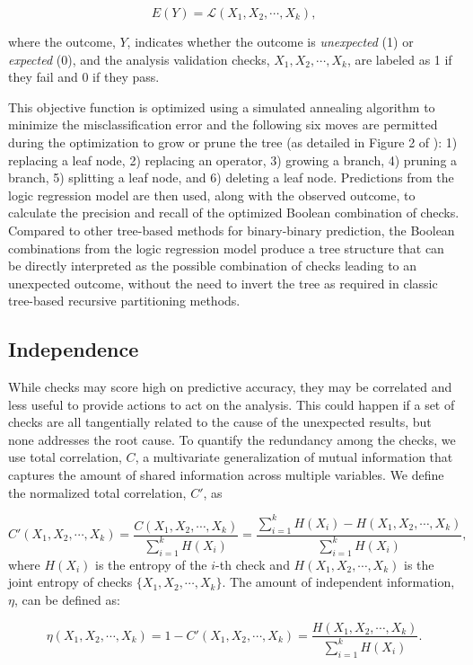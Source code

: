 \documentclass[
  12pt,
]{interact}
\begin{document}
\[E(Y) = \mathcal{L}(X_1, X_2, \cdots, X_k),\]

where the outcome, \(Y\), indicates whether the outcome is
\emph{unexpected} (1) or \emph{expected} (0), and the analysis
validation checks, \(X_1, X_2, \cdots, X_k\), are labeled as 1 if they
fail and 0 if they pass.

This objective function is optimized using a simulated annealing
algorithm to minimize the misclassification error and the following six
moves are permitted during the optimization to grow or prune the tree
(as detailed in Figure 2 of \citet{ruczinski_logic_2003}): 1) replacing
a leaf node, 2) replacing an operator, 3) growing a branch, 4) pruning a
branch, 5) splitting a leaf node, and 6) deleting a leaf node.
Predictions from the logic regression model are then used, along with
the observed outcome, to calculate the precision and recall of the
optimized Boolean combination of checks. Compared to other tree-based
methods for binary-binary prediction, the Boolean combinations from the
logic regression model produce a tree structure that can be directly
interpreted as the possible combination of checks leading to an
unexpected outcome, without the need to invert the tree as required in
classic tree-based recursive partitioning methods.

\subsection{Independence}\label{independence}

While checks may score high on predictive accuracy, they may be
correlated and less useful to provide actions to act on the analysis.
This could happen if a set of checks are all tangentially related to the
cause of the unexpected results, but none addresses the root cause. To
quantify the redundancy among the checks, we use total correlation,
\(C\), a multivariate generalization of mutual information that captures
the amount of shared information across multiple variables. We define
the normalized total correlation, \(C'\), as

\[C'(X_1, X_2, \cdots, X_k) = \frac{C(X_1, X_2, \cdots, X_k)}{\sum_{i= 1}^k H(X_i)} = \frac{\sum_{i= 1}^k H(X_i) - H(X_1, X_2, \cdots, X_k)}{\sum_{i= 1}^k H(X_i)}, \]
where \(H(X_i)\) is the entropy of the \(i\)-th check and
\(H(X_1, X_2, \cdots, X_k)\) is the joint entropy of checks
\(\{X_1, X_2, \cdots, X_k\}\). The amount of independent information,
\(\eta\), can be defined as:

\[\eta(X_1, X_2, \cdots, X_k) = 1 - C'(X_1, X_2, \cdots, X_k) = \frac{H(X_1, X_2, \cdots, X_k)}{\sum_{i= 1}^k H(X_i)}.\]
\end{document}
